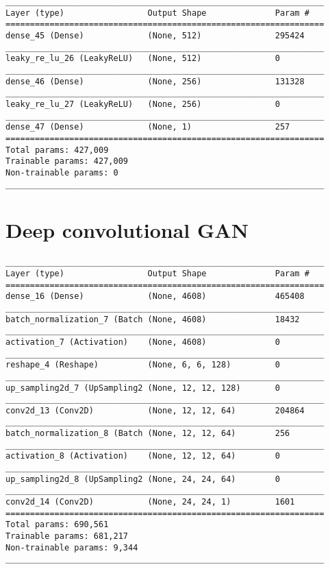 \begin{verbatim}
_________________________________________________________________
Layer (type)                 Output Shape              Param #   
=================================================================
dense_45 (Dense)             (None, 512)               295424    
_________________________________________________________________
leaky_re_lu_26 (LeakyReLU)   (None, 512)               0         
_________________________________________________________________
dense_46 (Dense)             (None, 256)               131328    
_________________________________________________________________
leaky_re_lu_27 (LeakyReLU)   (None, 256)               0         
_________________________________________________________________
dense_47 (Dense)             (None, 1)                 257       
=================================================================
Total params: 427,009
Trainable params: 427,009
Non-trainable params: 0
_________________________________________________________________
\end{verbatim}


\section{Deep convolutional GAN}
\label{appendix:dcgan}

\begin{verbatim}
_________________________________________________________________
Layer (type)                 Output Shape              Param #   
=================================================================
dense_16 (Dense)             (None, 4608)              465408    
_________________________________________________________________
batch_normalization_7 (Batch (None, 4608)              18432     
_________________________________________________________________
activation_7 (Activation)    (None, 4608)              0         
_________________________________________________________________
reshape_4 (Reshape)          (None, 6, 6, 128)         0         
_________________________________________________________________
up_sampling2d_7 (UpSampling2 (None, 12, 12, 128)       0         
_________________________________________________________________
conv2d_13 (Conv2D)           (None, 12, 12, 64)        204864    
_________________________________________________________________
batch_normalization_8 (Batch (None, 12, 12, 64)        256       
_________________________________________________________________
activation_8 (Activation)    (None, 12, 12, 64)        0         
_________________________________________________________________
up_sampling2d_8 (UpSampling2 (None, 24, 24, 64)        0         
_________________________________________________________________
conv2d_14 (Conv2D)           (None, 24, 24, 1)         1601      
=================================================================
Total params: 690,561
Trainable params: 681,217
Non-trainable params: 9,344
_________________________________________________________________
\end{verbatim}

